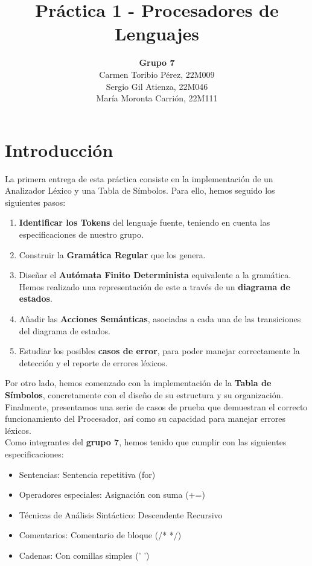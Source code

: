 \documentclass{article}
\title{\textbf{Práctica 1 - Procesadores de Lenguajes}}
\author{\textbf{Grupo 7}\\Carmen Toribio Pérez, 22M009\\Sergio Gil Atienza, 22M046\\María Moronta Carrión, 22M111}
\date{}
\begin{document}
\maketitle

\section{Introducción}

La primera entrega de esta práctica consiste en la implementación de un Analizador Léxico y una Tabla de Símbolos. Para ello, hemos seguido los siguientes pasos: 
\begin{enumerate}
    \item \textbf{Identificar los Tokens} del lenguaje fuente, teniendo en cuenta las especificaciones de nuestro grupo.
    \item Construir la \textbf{Gramática Regular} que los genera.
    \item Diseñar el \textbf{Autómata Finito Determinista} equivalente a la gramática. Hemos realizado una representación de este a través de un \textbf{diagrama de estados}.
    \item Añadir las \textbf{Acciones Semánticas}, asociadas a cada una de las transiciones del diagrama de estados.
    \item Estudiar los posibles \textbf{casos de error}, para poder manejar correctamente la detección y el reporte de errores léxicos. 
\end{enumerate}
 
 Por otro lado, hemos comenzado con la implementación de la \textbf{Tabla de Símbolos}, concretamente con el diseño de su estructura y su organización.\\

 Finalmente, presentamos una serie de casos de prueba que demuestran el correcto funcionamiento del Procesador, así como su capacidad para manejar errores léxicos.\\

Como integrantes del \textbf{grupo 7}, hemos tenido que cumplir con las siguientes especificaciones: 
\begin{itemize}[left=2cm]
    \item Sentencias: Sentencia repetitiva (for)
    \item Operadores especiales: Asignación con suma (+=)
    \item Técnicas de Análisis Sintáctico: Descendente Recursivo
    \item Comentarios: Comentario de bloque (/* */)
    \item Cadenas: Con comillas simples (' ')
\end{itemize}
\end{document}
